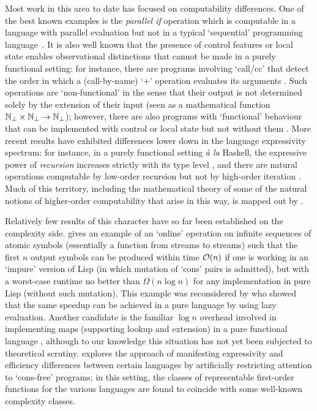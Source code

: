 \documentclass[12pt,phd,lfcs,twoside,openright,logo,leftchapter,normalheadings]{infthesis}
\theoremstyle{plain}
\theoremstyle{definition}
\begin{document}
Most work in this area to date has focused on computability
differences. One of the best known examples is the \emph{parallel if}
operation which is computable in a language with parallel evaluation
but not in a typical `sequential' programming
language~\cite{Plotkin77}. It is also well known that the presence of
control features or local state enables observational distinctions
that cannot be made in a purely functional setting: for instance,
there are programs involving `call/cc' that detect the order in which
a (call-by-name) `+' operation evaluates its arguments
\citep{CartwrightF92}. Such operations are `non-functional' in the
sense that their output is not determined solely by the extension of
their input (seen as a mathematical function
$\mathbb{N}_\bot \times \mathbb{N}_\bot \rightarrow \mathbb{N}_\bot$);
however, there are also programs with `functional' behaviour that can
be implemented with control or local state but not without them
\citep{Longley99}.  More recent results have exhibited differences
lower down in the language expressivity spectrum: for instance, in a
purely functional setting \textit{\`a la} Haskell, the expressive
power of \emph{recursion} increases strictly with its type level
\citep{Longley18a}, and there are natural operations computable by
low-order recursion but not by high-order iteration
\citep{Longley19}. Much of this territory, including the mathematical
theory of some of the natural notions of higher-order computability
that arise in this way, is mapped out by \citet{LongleyN15}.

Relatively few results of this character have so far been established
on the complexity side. \citet{Pippenger96} gives an example of an
`online' operation on infinite sequences of atomic symbols
(essentially a function from streams to streams) such that the first
$n$ output symbols can be produced within time $\mathcal{O}(n)$ if one is
working in an `impure' version of Lisp (in which mutation of `cons'
pairs is admitted), but with a worst-case runtime no better than
$\Omega(n \log n)$ for any implementation in pure Lisp (without such
mutation). This example was reconsidered by \citet{BirdJdM97} who
showed that the same speedup can be achieved in a pure language by
using lazy evaluation.  Another candidate is the familiar $\log n$
overhead involved in implementing maps (supporting lookup and
extension) in a pure functional language \cite{Okasaki99}, although to
our knowledge this situation has not yet been subjected to theoretical
scrutiny.  \citet{Jones01} explores the approach of manifesting
expressivity and efficiency differences between certain languages by
artificially restricting attention to `cons-free' programs; in this
setting, the classes of representable first-order functions for the
various languages are found to coincide with some well-known
complexity classes.
\end{document}
